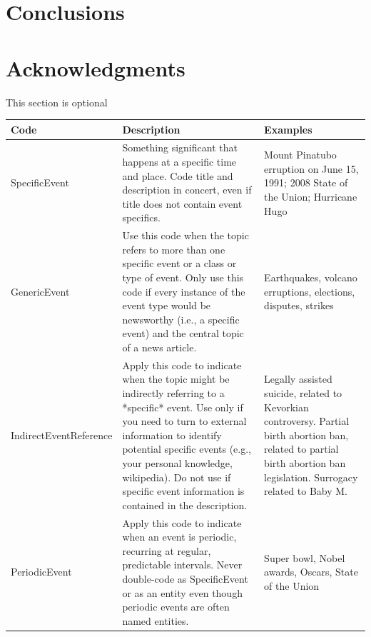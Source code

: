 \documentclass{sig-alternate}
\begin{document}
\section{Conclusions}


\section{Acknowledgments}
This section is optional

%



  

\appendix


\begin{table}[H]
\small
\begin{tabular}{| l | p{7cm}  | p{7cm}  |} \hline
\bf{Code} & \bf{Description} & \bf{Examples}  \\ \hline
SpecificEvent & Something significant that happens at a specific time and place. Code title and description in concert, even if title does not contain event specifics.  & Mount Pinatubo erruption on June 15, 1991; 2008 State of the Union; Hurricane Hugo \\ \hline
GenericEvent & Use this code when the topic refers to more than one specific event or a class or type of event. Only use this code if every instance of the event type would be newsworthy (i.e., a specific event) and the central topic of a news article. & Earthquakes, volcano erruptions, elections, disputes, strikes \\ \hline
IndirectEventReference & Apply this code to indicate when the topic might be indirectly referring to a *specific* event. Use only if you need to turn to external information to identify potential specific events (e.g., your personal knowledge, wikipedia).  Do not use if specific event information is contained in the description. & Legally assisted suicide, related to Kevorkian controversy. Partial birth abortion ban, related to partial birth abortion ban legislation. Surrogacy related to Baby M. \\ \hline
PeriodicEvent & Apply this code to indicate when an event is periodic, recurring at regular, predictable intervals.  Never double-code as SpecificEvent or as an entity even though periodic events are often named entities. & Super bowl, Nobel awards, Oscars, State of the Union \\ \hline

\end{tabular}
\end{table}
\end{document}
